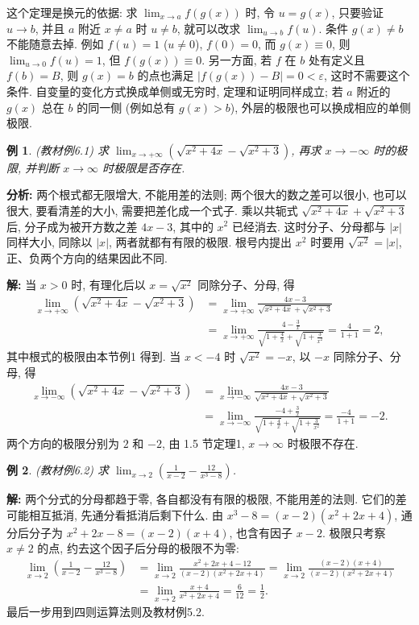 \documentclass[UTF8,openany]{ctexbook}
\theoremstyle{chinesetextbook}
\newtheorem{example}{例}[section]
\newenvironment{cnsolution}{\par\indent\textbf{解:} \ignorespaces}{\par}
\begin{document}
这个定理是换元的依据: 求 $\displaystyle\lim_{x\to a}f(g(x))$ 时, 令 $u=g(x)$, 只要验证 $u\to b$, 并且 $a$ 附近 $x\ne a$ 时 $u\ne b$, 就可以改求 $\displaystyle\lim_{u\to b}f(u)$. 条件 $g(x)\ne b$ 不能随意去掉. 例如 $f(u)=1$ ($u\ne0$), $f(0)=0$, 而 $g(x)\equiv0$, 则 $\displaystyle\lim_{u\to0}f(u)=1$, 但 $f(g(x))\equiv0$. 另一方面, 若 $f$ 在 $b$ 处有定义且 $f(b)=B$, 则 $g(x)=b$ 的点也满足 $|f(g(x))-B|=0<\varepsilon$, 这时不需要这个条件. 自变量的变化方式换成单侧或无穷时, 定理和证明同样成立; 若 $a$ 附近的 $g(x)$ 总在 $b$ 的同一侧 (例如总有 $g(x)>b$), 外层的极限也可以换成相应的单侧极限.
\begin{example}
\textnormal{(教材例6.1)} 求 $\displaystyle\lim_{x\to+\infty}\left(\sqrt{x^2+4x}-\sqrt{x^2+3}\right)$, 再求 $x\to-\infty$ 时的极限, 并判断 $x\to\infty$ 时极限是否存在.
\end{example}
\par\indent\textbf{分析:} 两个根式都无限增大, 不能用差的法则; 两个很大的数之差可以很小, 也可以很大, 要看清差的大小, 需要把差化成一个式子. 乘以共轭式 $\sqrt{x^2+4x}+\sqrt{x^2+3}$ 后, 分子成为被开方数之差 $4x-3$, 其中的 $x^2$ 已经消去. 这时分子、分母都与 $|x|$ 同样大小, 同除以 $|x|$, 两者就都有有限的极限. 根号内提出 $x^2$ 时要用 $\sqrt{x^2}=|x|$, 正、负两个方向的结果因此不同.
\begin{cnsolution}
当 $x>0$ 时, 有理化后以 $x=\sqrt{x^2}$ 同除分子、分母, 得
\[
\begin{aligned}
\lim_{x\to+\infty}\left(\sqrt{x^2+4x}-\sqrt{x^2+3}\right)
&=\lim_{x\to+\infty}\frac{4x-3}{\sqrt{x^2+4x}+\sqrt{x^2+3}}\\
&=\lim_{x\to+\infty}\frac{4-\frac3x}{\sqrt{1+\frac4x}+\sqrt{1+\frac3{x^2}}}=\frac4{1+1}=2,
\end{aligned}
\]
其中根式的极限由本节例1 得到. 当 $x<-4$ 时 $\sqrt{x^2}=-x$, 以 $-x$ 同除分子、分母, 得
\[
\begin{aligned}
\lim_{x\to-\infty}\left(\sqrt{x^2+4x}-\sqrt{x^2+3}\right)
&=\lim_{x\to-\infty}\frac{4x-3}{\sqrt{x^2+4x}+\sqrt{x^2+3}}\\
&=\lim_{x\to-\infty}\frac{-4+\frac3x}{\sqrt{1+\frac4x}+\sqrt{1+\frac3{x^2}}}=\frac{-4}{1+1}=-2.
\end{aligned}
\]
两个方向的极限分别为 $2$ 和 $-2$, 由 1.5 节定理1, $x\to\infty$ 时极限不存在.
\end{cnsolution}
\begin{example}
\textnormal{(教材例6.2)} 求 $\displaystyle\lim_{x\to2}\left(\frac1{x-2}-\frac{12}{x^3-8}\right)$.
\end{example}
\begin{cnsolution}
两个分式的分母都趋于零, 各自都没有有限的极限, 不能用差的法则. 它们的差可能相互抵消, 先通分看抵消后剩下什么. 由 $x^3-8=(x-2)(x^2+2x+4)$, 通分后分子为 $x^2+2x-8=(x-2)(x+4)$, 也含有因子 $x-2$. 极限只考察 $x\ne2$ 的点, 约去这个因子后分母的极限不为零:
\[
\begin{aligned}
\lim_{x\to2}\left(\frac1{x-2}-\frac{12}{x^3-8}\right)
&=\lim_{x\to2}\frac{x^2+2x+4-12}{(x-2)(x^2+2x+4)}=\lim_{x\to2}\frac{(x-2)(x+4)}{(x-2)(x^2+2x+4)}\\
&=\lim_{x\to2}\frac{x+4}{x^2+2x+4}=\frac6{12}=\frac12.
\end{aligned}
\]
最后一步用到四则运算法则及教材例5.2.
\end{cnsolution}
\end{document}
